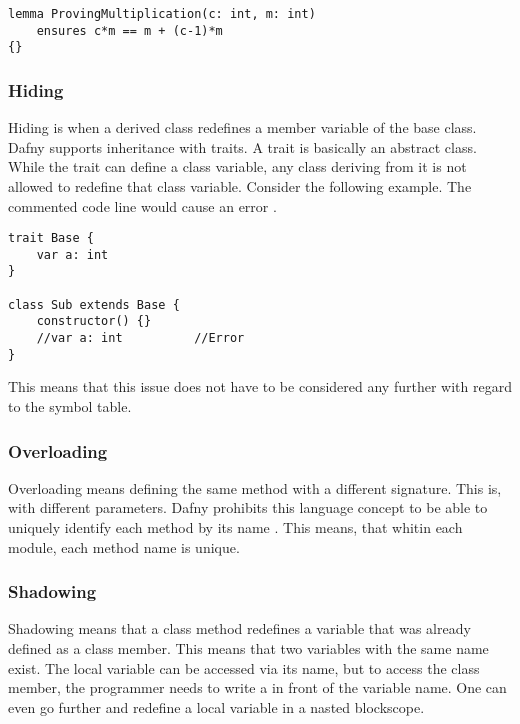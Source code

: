 \begin{lstlisting}[caption={Lemma}, captionpos=b, label={lst:lemma_example}]
lemma ProvingMultiplication(c: int, m: int)
    ensures c*m == m + (c-1)*m
{}
\end{lstlisting}

\subsubsection{Hiding}
Hiding is when a derived class redefines a member variable of the base class.
Dafny supports inheritance with traits.
A trait is basically an abstract class.
While the trait can define a class variable, any class deriving from it is not allowed to redefine that class variable.
Consider the following example.
The commented code line would cause an error \cite{dafnyReferenceManual}.

\begin{lstlisting}[caption={Hiding}, captionpos=b, label={lst:hiding}]
trait Base {
    var a: int
}

class Sub extends Base {
    constructor() {}
    //var a: int          //Error
}
\end{lstlisting}

This means that this issue does not have to be considered any further with regard to the symbol table.

\subsubsection{Overloading}
Overloading means defining the same method with a different signature.
This is, with different parameters.
Dafny prohibits this language concept to be able to uniquely identify each method by its name \cite{dafnyReferenceManual}.
This means, that whitin each module, each method name is unique.

\subsubsection{Shadowing}

Shadowing means that a class method redefines a variable that was already defined as a class member.
This means that two variables with the same name exist.
The local variable can be accessed via its name, but to access the class member, the programmer needs to write a  in front of the variable name.
One can even go further and redefine a local variable in a nasted blockscope.\\

